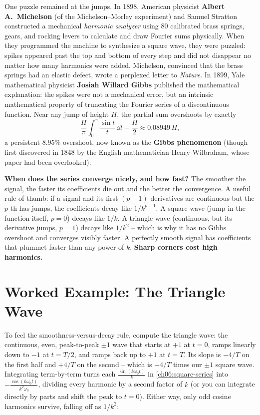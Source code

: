 \begin{historybox}
One puzzle remained at the jumps. In 1898, American physicist \textbf{Albert A.\ Michelson}
(of the Michelson--Morley experiment) and Samuel Stratton constructed a mechanical
\emph{harmonic analyzer} using 80 calibrated brass springs, gears, and rocking levers to calculate
and draw Fourier sums physically. When they programmed the machine to synthesize a square wave, they
were puzzled: spikes appeared past the top and bottom of every step and did not disappear no
matter how many harmonics were added. Michelson, convinced that the brass springs had an elastic
defect, wrote a perplexed letter to \emph{Nature}. In 1899, Yale mathematical physicist
\textbf{Josiah Willard Gibbs} published the mathematical explanation: the spikes were not a mechanical
error, but an intrinsic mathematical property of truncating the Fourier series of a discontinuous
function. Near any jump of height $H$, the partial sum overshoots by exactly
\[
\frac{H}{\pi}\int_0^\pi \frac{\sin t}{t}\,\dd t - \frac{H}{2} \approx 0.08949\,H,
\]
a persistent
$8.95\%$ overshoot, now known as the \textbf{Gibbs phenomenon} (though first discovered in 1848
by the English mathematician Henry Wilbraham, whose paper had been overlooked).
\end{historybox}

\begin{whybox}
\textbf{When does the series converge nicely, and how fast?} The smoother the signal, the
faster its coefficients die out and the better the convergence. A useful rule of thumb:
if a signal and its first \((p-1)\) derivatives are continuous but the \(p\)-th has jumps,
the coefficients decay like \(1/k^{p+1}\). A square wave (jump in the function itself,
\(p=0\)) decays like \(1/k\). A triangle wave (continuous, but its derivative jumps,
\(p=1\)) decays like \(1/k^2\) -- which is why it has no Gibbs overshoot and converges
visibly faster. A perfectly smooth signal has coefficients that plummet faster than any
power of \(k\). \textbf{Sharp corners cost high harmonics.}
\end{whybox}

\section{Worked Example: The Triangle Wave}

To feel the smoothness-versus-decay rule, compute the triangle wave: the continuous,
even, peak-to-peak \(\pm1\) wave that starts at \(+1\) at \(t=0\), ramps linearly down to \(-1\) at \(t=T/2\), and ramps back up to \(+1\) at \(t=T\). Its slope is \(-4/T\) on the first half and \(+4/T\) on the second -- which is \(-4/T\) times our \(\pm 1\) square wave. Integrating term-by-term turns each \(\frac{\sin(k\omega_0 t)}{k}\) in \eqref{ch06:square-series} into \(-\frac{\cos(k\omega_0 t)}{k^2\omega_0}\), dividing every harmonic by a second factor of \(k\) (or you can integrate directly by parts and shift the peak to \(t=0\)). Either way, only odd cosine harmonics survive, falling off as \(1/k^2\):

